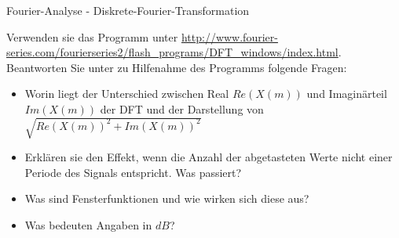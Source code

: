 
\begin{exercise}{Fourier-Analyse - Diskrete-Fourier-Transformation }
\label{ex-de-mt-fourier-4}

Verwenden sie das Programm unter \url{http://www.fourier-series.com/fourierseries2/flash_programs/DFT_windows/index.html}.\\
Beantworten Sie unter zu Hilfenahme des Programms folgende Fragen:
\begin{itemize}
  \item Worin liegt der Unterschied zwischen Real $Re(X(m))$ und
    Imagin\"arteil $Im(X(m))$
    der DFT und der Darstellung von  $\sqrt{Re(X(m))^2+Im(X(m))^2}$
  \item Erkl\"aren sie den Effekt, wenn die Anzahl der abgetasteten
    Werte nicht einer Periode des Signals entspricht. Was passiert?
  \item Was sind Fensterfunktionen und wie wirken sich diese aus?
  \item Was bedeuten Angaben in $dB$?
\end{itemize}
\end{exercise}